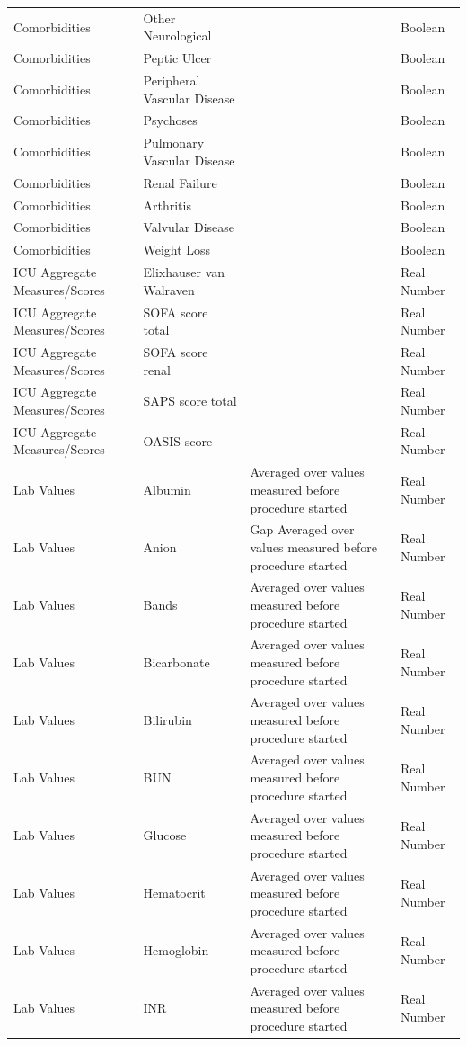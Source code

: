 \documentclass[conference,comsoc]{IEEEtran}
\begin{document}
\begin{longtable}[c]{C{0.2\textwidth} | C{0.2\textwidth} | C{0.4\textwidth} | C{0.2\textwidth}}
Comorbidities & Other Neurological & & Boolean \\
Comorbidities & Peptic Ulcer & & Boolean \\
Comorbidities & Peripheral Vascular Disease & & Boolean \\
Comorbidities & Psychoses & & Boolean \\
Comorbidities & Pulmonary Vascular Disease & & Boolean \\
Comorbidities & Renal Failure & & Boolean \\
Comorbidities & Arthritis & & Boolean \\
Comorbidities & Valvular Disease & & Boolean \\
Comorbidities & Weight Loss & & Boolean \\
ICU Aggregate Measures/Scores & Elixhauser van Walraven & & Real Number \\
ICU Aggregate Measures/Scores & SOFA score total & & Real Number \\
ICU Aggregate Measures/Scores & SOFA score renal & & Real Number \\
ICU Aggregate Measures/Scores & SAPS score total & & Real Number \\
ICU Aggregate Measures/Scores & OASIS score & & Real Number \\
Lab Values & Albumin & Averaged over values measured before procedure started  & Real Number \\
Lab Values & Anion & Gap   Averaged over values measured before procedure started  & Real Number \\
Lab Values & Bands &   Averaged over values measured before procedure started  & Real Number \\
Lab Values & Bicarbonate & Averaged over values measured before procedure started  & Real Number \\
Lab Values & Bilirubin &   Averaged over values measured before procedure started  & Real Number \\
Lab Values & BUN & Averaged over values measured before procedure started  & Real Number \\
Lab Values & Glucose & Averaged over values measured before procedure started  & Real Number \\
Lab Values & Hematocrit &  Averaged over values measured before procedure started  & Real Number \\
Lab Values & Hemoglobin &  Averaged over values measured before procedure started  & Real Number \\
Lab Values & INR & Averaged over values measured before procedure started  & Real Number \\

\end{longtable}
\end{document}
